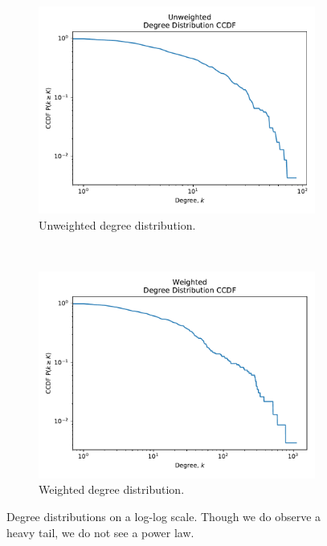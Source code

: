 \begin{figure}[t]
    \centering
    \begin{subfigure}{0.4\textwidth}
        \includegraphics[width=1.\textwidth]{images/unweighted_degree_distr_ccdf.pdf}
        \caption{Unweighted degree distribution.}
    \end{subfigure}
    ~
    \begin{subfigure}{0.4\textwidth}
        \includegraphics[width=1.\textwidth]{images/weighted_degree_distr_ccdf.pdf}
        \caption{Weighted degree distribution.}
    \end{subfigure}
    \caption{Degree distributions on a log-log scale. Though we do observe a heavy tail, we do not see a power law.}
    \label{fig:degree_distr}
\end{figure}

